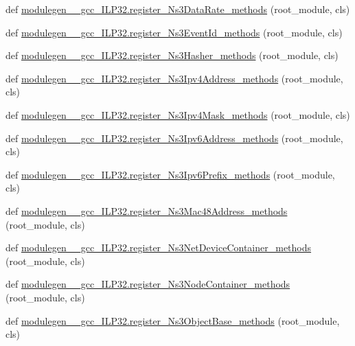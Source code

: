 \begin{DoxyCompactItemize}
\item 
def \hyperlink{namespacemodulegen____gcc__ILP32_a4eb2f9b3d4be750ab50fb46f1e494ed7}{modulegen\+\_\+\+\_\+gcc\+\_\+\+I\+L\+P32.\+register\+\_\+\+Ns3\+Data\+Rate\+\_\+methods} (root\+\_\+module, cls)
\item 
def \hyperlink{namespacemodulegen____gcc__ILP32_a380e15c15390ba7c3f21a3162cb67911}{modulegen\+\_\+\+\_\+gcc\+\_\+\+I\+L\+P32.\+register\+\_\+\+Ns3\+Event\+Id\+\_\+methods} (root\+\_\+module, cls)
\item 
def \hyperlink{namespacemodulegen____gcc__ILP32_a33425c5d69b8b6e93c725709f6aa95fb}{modulegen\+\_\+\+\_\+gcc\+\_\+\+I\+L\+P32.\+register\+\_\+\+Ns3\+Hasher\+\_\+methods} (root\+\_\+module, cls)
\item 
def \hyperlink{namespacemodulegen____gcc__ILP32_a3a069cad6e59687195ff869fd35923d3}{modulegen\+\_\+\+\_\+gcc\+\_\+\+I\+L\+P32.\+register\+\_\+\+Ns3\+Ipv4\+Address\+\_\+methods} (root\+\_\+module, cls)
\item 
def \hyperlink{namespacemodulegen____gcc__ILP32_a4f3623d807ca57aa642b7e9d784b1747}{modulegen\+\_\+\+\_\+gcc\+\_\+\+I\+L\+P32.\+register\+\_\+\+Ns3\+Ipv4\+Mask\+\_\+methods} (root\+\_\+module, cls)
\item 
def \hyperlink{namespacemodulegen____gcc__ILP32_acc57372433d228dd060a3165e8c17c71}{modulegen\+\_\+\+\_\+gcc\+\_\+\+I\+L\+P32.\+register\+\_\+\+Ns3\+Ipv6\+Address\+\_\+methods} (root\+\_\+module, cls)
\item 
def \hyperlink{namespacemodulegen____gcc__ILP32_aa8595c3a98eeb16457cb2bea21656ecd}{modulegen\+\_\+\+\_\+gcc\+\_\+\+I\+L\+P32.\+register\+\_\+\+Ns3\+Ipv6\+Prefix\+\_\+methods} (root\+\_\+module, cls)
\item 
def \hyperlink{namespacemodulegen____gcc__ILP32_a8e21fcb75de80cc6b1cd32abe7cfdd36}{modulegen\+\_\+\+\_\+gcc\+\_\+\+I\+L\+P32.\+register\+\_\+\+Ns3\+Mac48\+Address\+\_\+methods} (root\+\_\+module, cls)
\item 
def \hyperlink{namespacemodulegen____gcc__ILP32_aa9b79a6cfb60163ed439b9298fb5c7d7}{modulegen\+\_\+\+\_\+gcc\+\_\+\+I\+L\+P32.\+register\+\_\+\+Ns3\+Net\+Device\+Container\+\_\+methods} (root\+\_\+module, cls)
\item 
def \hyperlink{namespacemodulegen____gcc__ILP32_a29b309b6bee1fe59273ea5b33c29fde1}{modulegen\+\_\+\+\_\+gcc\+\_\+\+I\+L\+P32.\+register\+\_\+\+Ns3\+Node\+Container\+\_\+methods} (root\+\_\+module, cls)
\item 
def \hyperlink{namespacemodulegen____gcc__ILP32_ae2b1090e9e01cb32c1979aebbbf2d3d0}{modulegen\+\_\+\+\_\+gcc\+\_\+\+I\+L\+P32.\+register\+\_\+\+Ns3\+Object\+Base\+\_\+methods} (root\+\_\+module, cls)

\end{DoxyCompactItemize}
